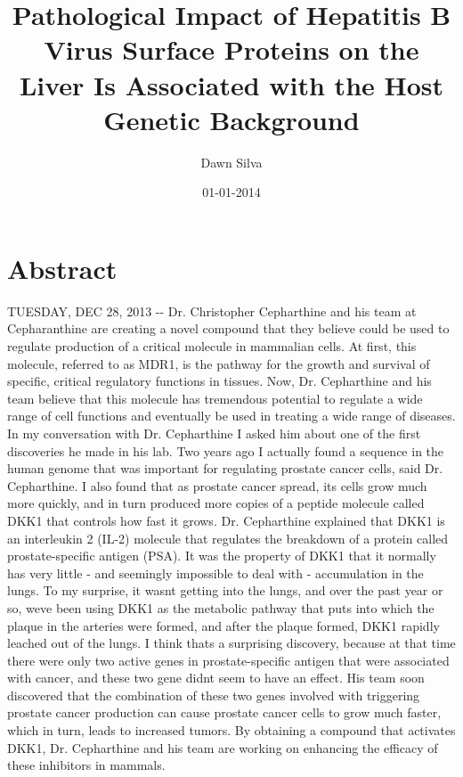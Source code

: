 \documentclass{article}%
\title{Pathological Impact of Hepatitis B Virus Surface Proteins on the Liver Is Associated with the Host Genetic Background}%
\author{Dawn Silva}%
\affil{Nephrology Unit, Department of Medicine, Faculty of Medicine, Thammasat University (Rangsit Campus), Khlong Nueng, Khlong Luang, Pathum Thani 12121, Thailand}%
\date{01{-}01{-}2014}%
\begin{document}
%
\normalsize%
\maketitle%
\section{Abstract}%
\label{sec:Abstract}%
TUESDAY, DEC 28, 2013 {-}{-} Dr. Christopher Cepharthine and his team at Cepharanthine are creating a novel compound that they believe could be used to regulate production of a critical molecule in mammalian cells. At first, this molecule, referred to as MDR1, is the pathway for the growth and survival of specific, critical regulatory functions in tissues. Now, Dr. Cepharthine and his team believe that this molecule has tremendous potential to regulate a wide range of cell functions and eventually be used in treating a wide range of diseases.\newline%
In my conversation with Dr. Cepharthine I asked him about one of the first discoveries he made in his lab. Two years ago I actually found a sequence in the human genome that was important for regulating prostate cancer cells, said Dr. Cepharthine. I also found that as prostate cancer spread, its cells grow much more quickly, and in turn produced more copies of a peptide molecule called DKK1 that controls how fast it grows.\newline%
Dr. Cepharthine explained that DKK1 is an interleukin 2 (IL{-}2) molecule that regulates the breakdown of a protein called prostate{-}specific antigen (PSA). It was the property of DKK1 that it normally has very little {-} and seemingly impossible to deal with {-} accumulation in the lungs. To my surprise, it wasnt getting into the lungs, and over the past year or so, weve been using DKK1 as the metabolic pathway that puts into which the plaque in the arteries were formed, and after the plaque formed, DKK1 rapidly leached out of the lungs. I think thats a surprising discovery, because at that time there were only two active genes in prostate{-}specific antigen that were associated with cancer, and these two gene didnt seem to have an effect.\newline%
His team soon discovered that the combination of these two genes involved with triggering prostate cancer production can cause prostate cancer cells to grow much faster, which in turn, leads to increased tumors. By obtaining a compound that activates DKK1, Dr. Cepharthine and his team are working on enhancing the efficacy of these inhibitors in mammals.\newline%
\end{document}
